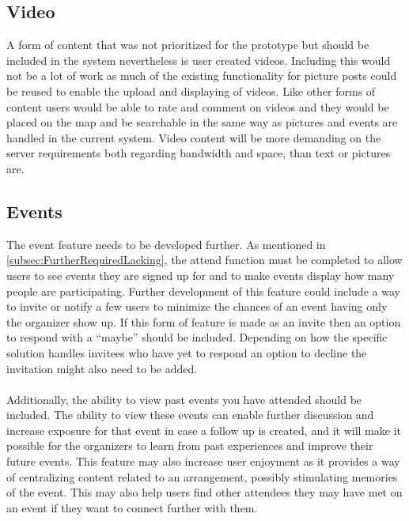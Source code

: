\subsection{Video}
\label{subsec:FurtherRequiredVideo}

A form of content that was not prioritized for the prototype but should be included in the system nevertheless is user created videos. Including this would not be a lot of work as much of the existing functionality for picture posts could be reused to enable the upload and displaying of videos. Like other forms of content users would be able to rate and comment on videos and they would be placed on the map and be searchable in the same way as pictures and events are handled in the current system. Video content will be more demanding on the server requirements both regarding bandwidth and space, than text or pictures are.

\subsection{Events}
\label{subsec:FurtherRequredEvents}

The event feature needs to be developed further. As mentioned in \ref{subsec:FurtherRequiredLacking}, the attend function must be completed to allow users to see events they are signed up for and to make events display how many people are participating. Further development of this feature could include a way to invite or notify a few users to minimize the chances of an event having only the organizer show up. If this form of feature is made as an invite then an option to respond with a “maybe” should be included. Depending on how the specific solution handles invitees who have yet to respond an option to decline the invitation might also need to be added.
\paragraph{} Additionally, the ability to view past events you have attended should be included. The ability to view these events can enable further discussion and increase exposure for that event in case a follow up is created, and it will make it possible for the organizers to learn from past experiences and improve their future events. This feature may also increase user enjoyment as it provides a way of centralizing content related to an arrangement, possibly stimulating memories of the event. This may also help users find other attendees they may have met on an event if they want to connect further with them.

